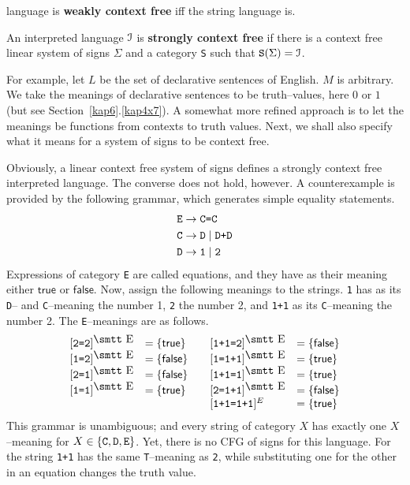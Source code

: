 language is \textbf{weakly context free} iff the string language 
is. 
\begin{defn}
An interpreted language $\mathcal{I}$ is \textbf{strongly context free}
if there is a context free linear system of signs $\Sigma$ and
a category {\tt S} such that $\mbox{\tt S}(\Sigma) = \mathcal{I}$.
\end{defn}
For example, let $L$ be the set of declarative sentences of English.
$M$ is arbitrary. We take the meanings of declarative sentences to be
truth--values, here $0$ or $1$ (but see Section~\ref{kap6}.\ref{kap4x7}). 
A somewhat more refined 
approach is to let the meanings be functions from contexts to truth 
values. Next, we shall also specify what it means for a system of
signs to be context free.

Obviously, a linear context free system of signs defines a strongly
context free interpreted language. The converse does not hold,
however. A counterexample is provided by the following grammar,
which generates simple equality statements.
\begin{equation}
\begin{split}
\mbox{\tt E} & \rightarrow \mbox{\tt C=C} \\
\mbox{\tt C} & \rightarrow \mbox{\tt D} \mid \mbox{\tt D+D} \\
\mbox{\tt D} & \rightarrow \mbox{\tt 1} \mid \mbox{\tt 2}
\end{split}
\end{equation}
Expressions of category {\tt E} are called equations, and they have
as their meaning either $\mathsf{true}$ or $\mathsf{false}$. Now, assign 
the following meanings to the strings.  {\tt 1} has as its {\tt D}-- 
and {\tt C}--meaning the number 1, {\tt 2} the number 2, and {\tt 1+1} 
as its {\tt C}--meaning the number 2. The {\tt E}--meanings are as follows.
\newcommand{\sE}{\mbox{\smtt E}}
\begin{equation}
\begin{array}{ll@{\qquad}ll}
\mbox{}[\mbox{\tt 2=2}]^{\sE} & = \{\mathsf{true}\} 
	& [\mbox{\tt 1+1=2}]^{\sE} & = \{\mathsf{false}\} \\
\mbox{}[\mbox{\tt 1=2}]^{\sE} & = \{\mathsf{false}\} 
	& [\mbox{\tt 1=1+1}]^{\sE} & = \{\mathsf{true}\} \\
\mbox{}[\mbox{\tt 2=1}]^{\sE} & = \{\mathsf{false}\}
	& [\mbox{\tt 1+1=1}]^{\sE} & = \{\mathsf{true}\} \\
\mbox{}[\mbox{\tt 1=1}]^{\sE} & = \{\mathsf{true}\} 
	& [\mbox{\tt 2=1+1}]^{\sE} & = \{\mathsf{false}\} \\
                   &          & [\mbox{\tt 1+1=1+1}]^E & = \{\mathsf{true}\}
\end{array}
\end{equation}
This grammar is unambiguous; and every string of category $X$ has 
exactly one $X$--meaning for $X \in \{\mbox{\tt C}, \mbox{\tt D}, 
\mbox{\tt E}\}$. Yet, there is no CFG of signs for this language. 
For the string {\tt 1+1} has the same {\tt T}--meaning as {\tt 2}, 
while substituting one for the other in an equation changes the 
truth value.

